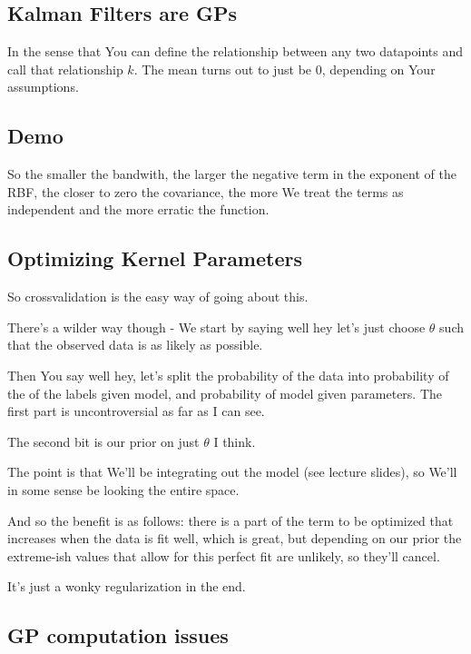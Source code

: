 \documentclass{article}
\begin{document}
	\subsection{Kalman Filters are GPs}
	
		In the sense that You can define the relationship between any two datapoints and call that relationship $k$. The mean turns out to just be $0$, depending on Your assumptions.
		
	\subsection{Demo}
	
		So the smaller the bandwith, the larger the negative term in the exponent of the RBF, the closer to zero the covariance, the more We treat the terms as independent and the more erratic the function.
		
	\subsection{Optimizing Kernel Parameters}
	
		So crossvalidation is the easy way of going about this.
		
		There's a wilder way though - We start by saying well hey let's just choose $\theta$ such that the observed data is as likely as possible.
		
		Then You say well hey, let's split the probability of the data into probability of the of the labels given model, and probability of model given parameters. The first part is uncontroversial as far as I can see.
		
		The second bit is our prior on just $\theta$ I think. 
		
		The point is that We'll be integrating out the model (see lecture slides), so We'll in some sense be looking the entire space.
		
		And so the benefit is as follows: there is a part of the term to be optimized that increases when the data is fit well, which is great, but depending on our prior the extreme-ish values that allow for this perfect fit are unlikely, so they'll cancel. 
		
		It's just a wonky regularization in the end.
	
	\subsection{GP computation issues}
	
\end{document}
